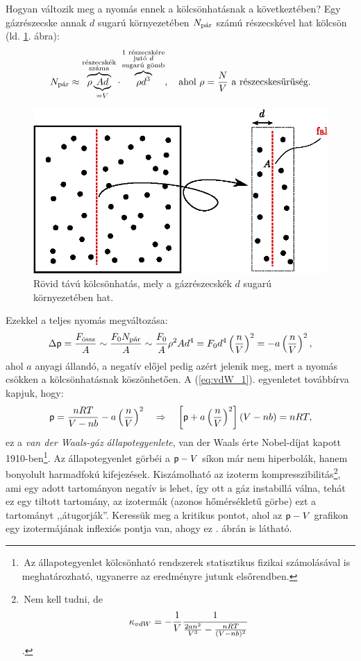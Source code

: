 Hogyan változik meg a nyomás ennek a kölcsönhatásnak a következtében? Egy gázrészecske annak $d$ sugarú környezetében $N_{\textnormal{pár}}$ számú részecskével hat kölcsön (ld. \ref{fig:termo_4_6}. ábra):
\begin{align}
    N_{\textnormal{pár}} \approx \overbrace{\rho\underbrace{Ad}_{=V}}^{\substack{\textnormal{részecskék}\\\textnormal{száma}}}\cdot\overbrace{\rho d^3}^{\substack{\textnormal{1 részecskére}\\\textnormal{jutó $d$}\\\textnormal{sugarú gömb}}},\quad \textnormal{ahol }\rho=\frac NV\textnormal{ a részecskesűrűség}.
\end{align}
\begin{figure}
    \centering
    \includegraphics{termo_4/termo_4_6.eps}
    \caption{Rövid távú kölcsönhatás, mely a gázrészecskék $d$ sugarú környezetében hat.}
    \label{fig:termo_4_6}
\end{figure}
Ezekkel a teljes nyomás megváltozása:
\begin{align}
    \Delta\mathsf p = \frac{F_{\textnormal{össz}}}{A}\sim \frac{F_0N_{\textnormal{pár}}}{A}\sim \frac{F_0}{A}\rho^2 A d^4 = F_0d^4\left({\frac nV}\right)^2 = -a\left({\frac nV}\right)^2,
\end{align}
ahol $a$ anyagi állandó, a negatív előjel pedig azért jelenik meg, mert a nyomás csökken a kölcsönhatásnak köszönhetően. A (\ref{eq:vdW_1}). egyenletet továbbírva kapjuk, hogy:
\begin{align}
    \mathsf p = \frac{nRT}{V-nb}-a\left({\frac nV}\right)^2 \quad\Rightarrow\quad \left[{\mathsf p+a\left({\frac nV}\right)^2}\right](V-nb) = nRT,
\end{align}
ez a \emph{van der Waals-gáz állapotegyenlete}, van der Waals érte Nobel-díjat kapott 1910-ben\footnote{\,Az állapotegyenlet kölcsönható rendszerek statisztikus fizikai számolásával is meghatározható, ugyanerre az eredményre jutunk elsőrendben.}. Az állapotegyenlet görbéi a $\mathsf p-V$ síkon már nem hiperbolák, hanem bonyolult harmadfokú kifejezések. Kiszámolható az izoterm kompresszibilitás\footnote{\,Nem kell tudni, de $$\kappa_{vdW} = -\frac{1}{V} \frac{1}{\frac{2an^2}{V^3}-\frac{nRT}{(V-nb)^2}}$$.}, ami egy adott tartományon negatív is lehet, így ott a gáz instabillá válna, tehát ez egy tiltott tartomány, az izotermák (azonos hőmérsékletű görbe) ezt a tartományt ,,átugorják''. Keressük meg a kritikus pontot, ahol az $\mathsf p-V$ grafikon egy izotermájának inflexiós pontja van, ahogy ez . ábrán is látható.

